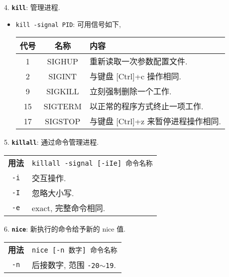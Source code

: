 4. \textbf{\texttt{kill}}: 管理进程.
\begin{itemize}
\item \texttt{kill -signal PID}: 可用信号如下,
\begin{longtable}{c|c|p{}}\hline

    代号 & 名称 & 内容 \\\hline

    1 & SIGHUP & 重新读取一次参数配置文件.\\

    2 & SIGINT & 与键盘 [Ctrl]+c 操作相同. \\

    9 & SIGKILL & 立刻强制删除一个工作.\\

    15 & SIGTERM & 以正常的程序方式终止一项工作.\\

    17 & SIGSTOP & 与键盘 [Ctrl]+z 来暂停进程操作相同.\\

    \hline
\end{longtable}

\end{itemize}

\par
5. \textbf{\texttt{killall}}: 通过命令管理进程.
\begin{longtable}{c@{ : }p{}}\hline\hline

    \textbf{用法} & \verb"killall -signal [-iIe] 命令名称"\\

    \texttt{-i} & 交互操作.\\

    \texttt{-I} & 忽略大小写.\\

    \texttt{-e} & exact, 完整命令相同.\\

    \hline
\end{longtable}

\par
6. \textbf{\texttt{nice}}: 新执行的命令给予新的 nice 值.
\begin{longtable}{c@{ : }p{}}\hline\hline

    \textbf{用法} & \verb"nice [-n 数字] 命令名称"\\

    \texttt{-n} & 后接数字, 范围 \texttt{-20$\sim$19}.\\

    \hline
\end{longtable}

